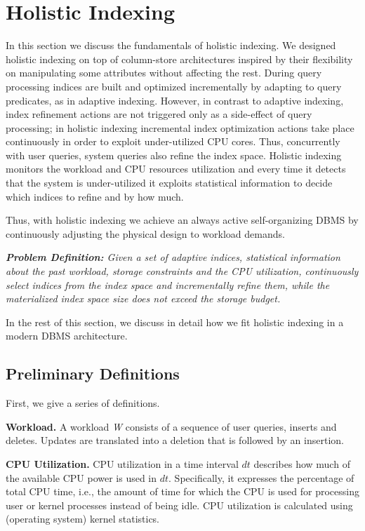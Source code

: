 \section{Holistic Indexing}
\label{sec:problem}

In this section we discuss the fundamentals of holistic indexing.
We designed holistic indexing on top of column-store architectures inspired by their flexibility on manipulating some attributes without affecting the rest.
During query processing indices are built and optimized incrementally by adapting to query predicates, as in adaptive indexing.
However, in contrast to adaptive indexing, index refinement actions are not triggered only as a side-effect of query processing; 
in holistic indexing incremental index optimization actions take place continuously in order to exploit 
under-utilized CPU cores. Thus, concurrently with user queries, system queries also refine the index space.
Holistic indexing monitors the workload and CPU resources utilization and every time it detects that the system is under-utilized
it exploits statistical information to decide which indices to refine and by how much. 

Thus, with holistic indexing we achieve an always active 
self-organizing DBMS by continuously adjusting the physical design to workload demands.

\vspace{2mm}
\emph{\textbf{Problem Definition:} Given a set of adaptive indices, statistical information about the past workload, storage constraints and the CPU utilization, continuously select indices from the index space and incrementally refine them, while the materialized index space size does not exceed the storage budget.}
\vspace{2mm}

In the rest of this section, we discuss in detail how we fit holistic indexing in a modern DBMS architecture. 

\subsection{Preliminary Definitions}
\label{subsec:definitions}

First, we give a series of definitions.

\textbf{Workload.} A workload \emph{W} consists of a sequence of user queries, inserts and deletes. Updates are translated into a deletion that is followed by an insertion.

\textbf{CPU Utilization.} CPU utilization in a time interval $dt$ describes how much of the available CPU power is used in $dt$. Specifically, it expresses the percentage of total CPU time, i.e., the amount of time for which the CPU is used for processing user or kernel processes instead of being idle. CPU utilization is calculated using (operating system) kernel statistics.

